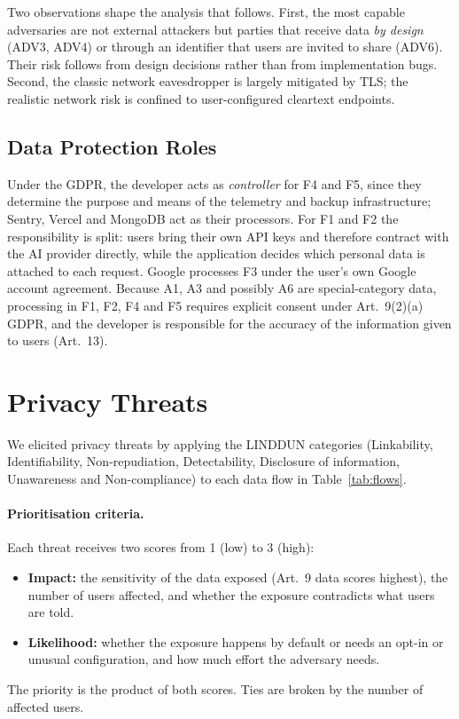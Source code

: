 Two observations shape the analysis that follows. First, the most capable adversaries are not
external attackers but parties that receive data \emph{by design} (ADV3, ADV4) or through an
identifier that users are invited to share (ADV6). Their risk follows from design decisions
rather than from implementation bugs. Second, the classic network eavesdropper is largely
mitigated by TLS; the realistic network risk is confined to user-configured cleartext endpoints.

\subsection{Data Protection Roles}
Under the GDPR, the developer acts as \emph{controller} for F4 and F5, since they determine the
purpose and means of the telemetry and backup infrastructure; Sentry, Vercel and MongoDB act as
their processors. For F1 and F2 the responsibility is split: users bring their own API keys and
therefore contract with the AI provider directly, while the application decides which personal
data is attached to each request. Google processes F3 under the user's own Google account
agreement. Because A1, A3 and possibly A6 are special-category data, processing in F1, F2, F4 and
F5 requires explicit consent under Art.~9(2)(a) GDPR, and the developer is responsible for the
accuracy of the information given to users (Art.~13).

\section{Privacy Threats}
\label{sec:privacy-threats}

We elicited privacy threats by applying the LINDDUN categories (Linkability, Identifiability,
Non-repudiation, Detectability, Disclosure of information, Unawareness and Non-compliance) to each
data flow in Table~\ref{tab:flows}.

\paragraph{Prioritisation criteria.} Each threat receives two scores from 1 (low) to 3 (high):
\begin{itemize}
  \item \textbf{Impact:} the sensitivity of the data exposed (Art.~9 data scores highest), the
        number of users affected, and whether the exposure contradicts what users are told.
  \item \textbf{Likelihood:} whether the exposure happens by default or needs an opt-in or
        unusual configuration, and how much effort the adversary needs.
\end{itemize}
The priority is the product of both scores. Ties are broken by the number of affected users.

